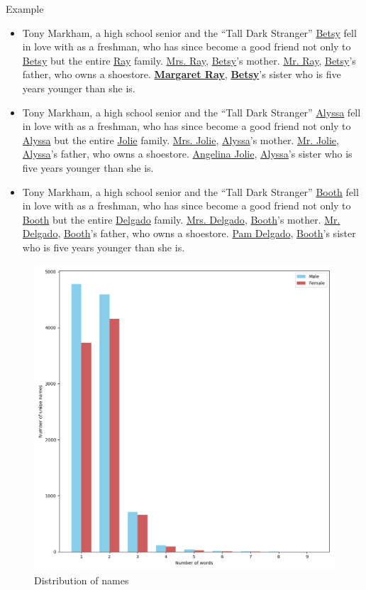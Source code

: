\documentclass[10pt]{beamer}
\begin{document}
\begin{frame}{Example}
  \begin{itemize}
  \item Tony Markham, a high school senior and the ``Tall Dark Stranger'' \underline{Betsy} fell in love with as a freshman, who has since become a good friend not only to \underline{Betsy} but the entire \underline{Ray} family. \underline{Mrs. Ray}, \underline{Betsy}'s mother. \underline{Mr. Ray}, \underline{Betsy}'s father, who owns a shoestore. \textbf{\underline{Margaret Ray}}, \textbf{\underline{Betsy}}'s sister who is five years younger than she is.

  \item Tony Markham, a high school senior and the ``Tall Dark Stranger'' \underline{Alyssa} fell in love with as a freshman, who has since become a good friend not only to \underline{Alyssa} but the entire \underline{Jolie} family. \underline{Mrs. Jolie}, \underline{Alyssa}'s mother. \underline{Mr. Jolie}, \underline{Alyssa}'s father, who owns a shoestore. \underline{Angelina Jolie}, \underline{Alyssa}'s sister who is five years younger than she is.
    
  \item Tony Markham, a high school senior and the ``Tall Dark Stranger'' \underline{Booth} fell in love with as a freshman, who has since become a good friend not only to \underline{Booth} but the entire \underline{Delgado} family. \underline{Mrs. Delgado}, \underline{Booth}'s mother. \underline{Mr. Delgado}, \underline{Booth}'s father, who owns a shoestore. \underline{Pam Delgado}, \underline{Booth}'s sister who is five years younger than she is.
  \end{itemize}    
\end{frame}

\begin{frame}
  \begin{figure}
    \centering
    \includegraphics[width=.7\textwidth]{augment_dist.png}
    \caption{Distribution of names}
    \label{fig:dist_names}
  \end{figure}
\end{frame}
\end{document}
